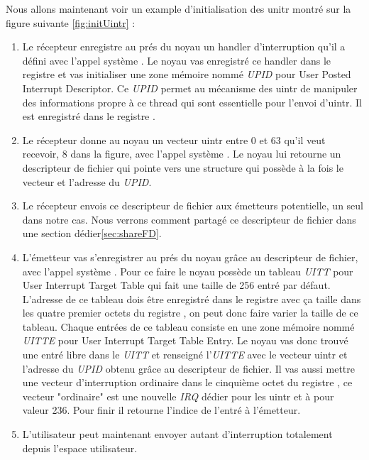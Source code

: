 Nous allons maintenant voir un example d'initialisation des unitr montré sur la figure suivante \ref{fig:initUintr} :

\begin{enumerate}[label=\protect\circled{\arabic*}]
  \item Le récepteur enregistre au prés du noyau un handler d'interruption qu'il a défini avec l'appel système .
  Le noyau vas enregistré ce handler dans le registre  et vas initialiser une zone mémoire nommé \emph{UPID} pour User Posted Interrupt Descriptor.
  Ce \emph{UPID} permet au mécanisme des uintr de manipuler des informations propre à ce thread qui sont essentielle pour l'envoi d'uintr.
  Il est enregistré dans le registre .
  \item Le récepteur donne au noyau un vecteur uintr entre 0 et 63 qu'il veut recevoir, 8 dans la figure, avec l'appel système . Le noyau lui retourne un descripteur de fichier qui pointe vers une structure qui possède à la fois le vecteur et l'adresse du \emph{UPID}.
  \item Le récepteur envois ce descripteur de fichier aux émetteurs potentielle, un seul dans notre cas. Nous verrons comment partagé ce descripteur de fichier dans une section dédier\ref{sec:shareFD}.
  \item L'émetteur vas s'enregistrer au prés du noyau grâce au descripteur de fichier, avec l'appel système .
  Pour ce faire le noyau possède un tableau \emph{UITT} pour User Interrupt Target Table qui fait une taille de 256 entré par défaut.
  L'adresse de ce tableau dois être enregistré dans le registre  avec ça taille dans les quatre premier octets du registre , on peut donc faire varier la taille de ce tableau.
  Chaque entrées de ce tableau consiste en une zone mémoire nommé \emph{UITTE} pour User Interrupt Target Table Entry.
  Le noyau vas donc trouvé une entré libre dans le \emph{UITT} et renseigné l'\emph{UITTE} avec le vecteur uintr et l'adresse du \emph{UPID} obtenu grâce au descripteur de fichier.
  Il vas aussi mettre une vecteur d'interruption ordinaire dans le cinquième octet du registre , ce vecteur "ordinaire" est une nouvelle \emph{IRQ} dédier pour les uintr et à pour valeur 236.
  Pour finir il retourne l'indice de l'entré à l'émetteur.
  \item L'utilisateur peut maintenant envoyer autant d'interruption totalement depuis l'espace utilisateur.
\end{enumerate}

